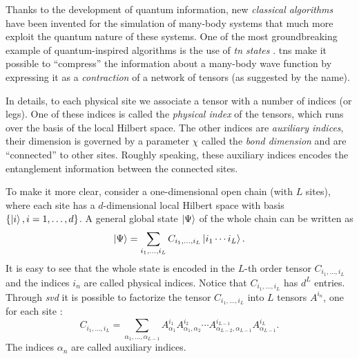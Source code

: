 Thanks to the development of quantum information, new \emph{classical algorithms} have been invented for the simulation of many-body systems that much more exploit the quantum nature of these systems.
One of the most groundbreaking example of quantum-inspired algorithms is the use of \emph{\ac{tn} states} \cite{orus2014tensor, verstraete2004algo, verstraete2008tensor, verstraete2004dmrg, vidal2008simulation, cirac2009tensor}.
\Acp{tn} make it possible to ``compress'' the information about a many-body wave function by expressing it as a \emph{contraction} of a network of tensors (as suggested by the name).

In details, to each physical site we associate a tensor with a number of indices (or legs).
One of these indices is called the \emph{physical index} of the tensors, which runs over the basis of the local Hilbert space.
The other indices are \emph{auxiliary indices}, their dimension is governed by a parameter $\chi$ called the \emph{bond dimension} and are ``connected'' to other sites.
Roughly speaking, these auxiliary indices encodes the entanglement information between the connected sites.

To make it more clear, consider a one-dimensional open chain (with $L$ sites), where each site has a $d$-dimensional local Hilbert space with basis $\{\ket{i}, i = 1,\dots,d\}$.
A general global state $\ket{\Psi}$ of the whole chain can be written as
\begin{equation}
    \ket{\Psi} = \sum_{i_1, \dots, i_L} C_{i_1, \dots, i_L} \ket{i_1 \cdots i_L}.
\end{equation}
It is easy to see that the whole state is encoded in the $L$-th order tensor $C_{i_1, \dots, i_L}$ and the indices $i_n$ are called physical indices.
Notice that $C_{i_1, \dots, i_L}$ has $d^L$ entries.
Through \emph{\ac{svd}} it is possible to factorize the tensor $C_{i_1, \dots, i_L}$ into $L$ tensors $A^{i_n}$, one for each site \cite{schollwock2011dmrg}:
\begin{equation}
    C_{i_1, \dots, i_L}
    = \sum_{\alpha_1, \dots, \alpha_{L-1}}
    A^{i_1}_{\alpha_1}
    A^{i_2}_{\alpha_1, \alpha_2}
    \cdots
    A^{i_{L-1}}_{\alpha_{L-2}, \alpha_{L-1}}
    A^{i_L}_{\alpha_{L-1}}.
    \label{eq:mps_decomposition}
\end{equation}
The indices $\alpha_n$ are called auxiliary indices.

